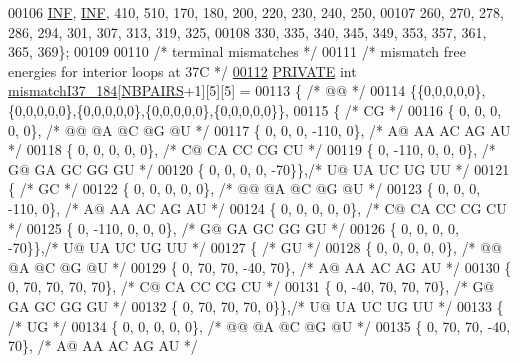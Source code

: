 \begin{DoxyCode}
00106   \mbox{\hyperlink{1_88_84__epars_8h_a12c2040f25d8e3a7b9e1c2024c618cb6}{INF}}, \mbox{\hyperlink{1_88_84__epars_8h_a12c2040f25d8e3a7b9e1c2024c618cb6}{INF}}, 410, 510, 170, 180, 200, 220, 230, 240, 250,
00107        260, 270, 278, 286, 294, 301, 307, 313, 319, 325,
00108        330, 335, 340, 345, 349, 353, 357, 361, 365, 369\};
00109 
00110 \textcolor{comment}{/* terminal mismatches */}
00111 \textcolor{comment}{/* mismatch free energies for interior loops at 37C */}
\mbox{\hyperlink{1_88_84__epars_8h_aa19b772336a246248ce46c4d7f947e5a}{00112}} \mbox{\hyperlink{edit__cost_8h_a5e151c615eda34903514212f05a5ccf8}{PRIVATE}} \textcolor{keywordtype}{int} \mbox{\hyperlink{1_88_84__epars_8h_aa19b772336a246248ce46c4d7f947e5a}{mismatchI37\_184}}[\mbox{\hyperlink{1_88_84__epars_8h_a5e75221c779d618eab81e096f37e32ce}{NBPAIRS}}+1][5][5] =
00113 \{ \textcolor{comment}{/* @@ */}
00114   \{\{0,0,0,0,0\},\{0,0,0,0,0\},\{0,0,0,0,0\},\{0,0,0,0,0\},\{0,0,0,0,0\}\},
00115   \{ \textcolor{comment}{/* CG */}
00116    \{   0,    0,    0,    0,    0\}, \textcolor{comment}{/* @@  @A  @C  @G  @U */}
00117    \{   0,    0,    0, -110,    0\}, \textcolor{comment}{/* A@  AA  AC  AG  AU */}
00118    \{   0,    0,    0,    0,    0\}, \textcolor{comment}{/* C@  CA  CC  CG  CU */}
00119    \{   0, -110,    0,    0,    0\}, \textcolor{comment}{/* G@  GA  GC  GG  GU */}
00120    \{   0,    0,    0,    0,  -70\}\},\textcolor{comment}{/* U@  UA  UC  UG  UU */}
00121   \{ \textcolor{comment}{/* GC */}
00122    \{   0,    0,    0,    0,    0\}, \textcolor{comment}{/* @@  @A  @C  @G  @U */}
00123    \{   0,    0,    0, -110,    0\}, \textcolor{comment}{/* A@  AA  AC  AG  AU */}
00124    \{   0,    0,    0,    0,    0\}, \textcolor{comment}{/* C@  CA  CC  CG  CU */}
00125    \{   0, -110,    0,    0,    0\}, \textcolor{comment}{/* G@  GA  GC  GG  GU */}
00126    \{   0,    0,    0,    0,  -70\}\},\textcolor{comment}{/* U@  UA  UC  UG  UU */}
00127   \{ \textcolor{comment}{/* GU */}
00128    \{   0,    0,    0,    0,    0\}, \textcolor{comment}{/* @@  @A  @C  @G  @U */}
00129    \{   0,   70,   70,  -40,   70\}, \textcolor{comment}{/* A@  AA  AC  AG  AU */}
00130    \{   0,   70,   70,   70,   70\}, \textcolor{comment}{/* C@  CA  CC  CG  CU */}
00131    \{   0,  -40,   70,   70,   70\}, \textcolor{comment}{/* G@  GA  GC  GG  GU */}
00132    \{   0,   70,   70,   70,    0\}\},\textcolor{comment}{/* U@  UA  UC  UG  UU */}
00133   \{ \textcolor{comment}{/* UG */}
00134    \{   0,    0,    0,    0,    0\}, \textcolor{comment}{/* @@  @A  @C  @G  @U */}
00135    \{   0,   70,   70,  -40,   70\}, \textcolor{comment}{/* A@  AA  AC  AG  AU */}

\end{DoxyCode}
